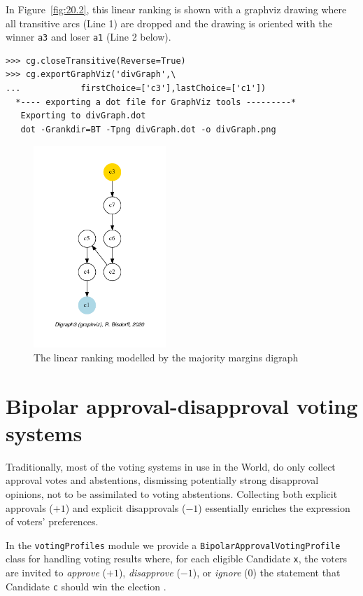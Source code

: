 In Figure~\vref{fig:20.2}, this linear ranking is shown with a graphviz drawing where all transitive arcs (Line 1) are dropped and the drawing is oriented with the \Condorcet winner \texttt{a3} and loser \texttt{a1} (Line 2 below).
\begin{lstlisting}
>>> cg.closeTransitive(Reverse=True)
>>> cg.exportGraphViz('divGraph',\
...            firstChoice=['c3'],lastChoice=['c1'])
  *---- exporting a dot file for GraphViz tools ---------*
   Exporting to divGraph.dot
   dot -Grankdir=BT -Tpng divGraph.dot -o divGraph.png
\end{lstlisting}
\begin{figure}[ht]
\sidecaption[t]
\includegraphics[width=5cm]{Figures/20-2-divGraph.pdf}
\caption{The linear ranking modelled by the majority margins digraph} 
\label{fig:20.2}       %
\end{figure}

\section{Bipolar approval-disapproval voting systems}
\label{sec:20.2}

Traditionally, most of the voting systems in use in the World, do only collect approval votes and abstentions, dismissing potentially strong disapproval opinions, not to be assimilated to voting abstentions. Collecting both explicit approvals ($+1$) and explicit disapprovals ($-1$) essentially enriches the expression of voters' preferences. 

In the \texttt{votingProfiles} module we provide a \texttt{BipolarApprovalVot\-ingProfile} class for handling voting results where, for each eligible Candidate \texttt{x}, the voters are invited  to \emph{approve} ($+1$), \emph{disapprove} ($-1$), or \emph{ignore} ($0$) the statement that Candidate \texttt{c} should win the election \citep{BAU-2012}.

